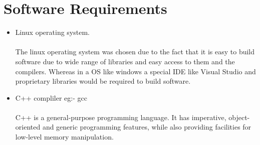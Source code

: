 \documentclass[11pt]{report}
\begin{document}
\section{Software Requirements}
\begin{itemize}
    \item Linux operating system.
    \\
    \\The linux operating system was chosen due to the fact that it is easy to build software due to wide range of libraries and easy access to them and the compilers. Whereas in a OS like windows a special IDE like Visual Studio and proprietary libraries would be required to build software.
    \item C++ compliler eg:- gcc
    \\
    \\C++ is a general-purpose programming language. It has imperative, object-oriented and generic programming features, while also providing facilities for low-level memory manipulation.


\end{itemize}
\end{document}

